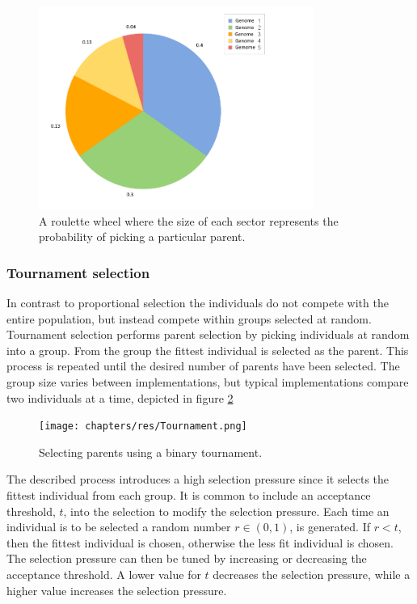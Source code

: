 \begin{figure}[H]
	\centering
	\includegraphics[width=0.80\textwidth, clip]{chapters/res/roulette.png}
	\caption{A roulette wheel where the size of each sector represents the probability of picking a particular parent.}
	\label{fig:roulette}
\end{figure}
		
\subsubsection{Tournament selection}
In contrast to proportional selection the individuals do not compete with the entire population, but instead compete within groups selected at random.
Tournament selection performs parent selection by picking individuals at random into a group.
From the group the fittest individual is selected as the parent.
This process is repeated until the desired number of parents have been selected.
The group size varies between implementations, but typical implementations compare two\cite{goh_sexual_2003} individuals at a time, depicted in figure \ref{fig:tournament}
		
\begin{figure}[H]	
	\centering
	\texttt{[image: chapters/res/Tournament.png]}
	\caption{Selecting parents using a binary tournament.}
	\label{fig:tournament}
\end{figure}

The described process introduces a high selection pressure since it selects the fittest individual from each group.
It is common to include an acceptance threshold, $t$, into the selection to modify the selection pressure\cite{goh_sexual_2003}.
Each time an individual is to be selected a random number $r \in (0, 1)$, is generated.
If $r < t$, then the fittest individual is chosen, otherwise the less fit individual is chosen. The selection pressure can then be tuned by increasing or decreasing the acceptance threshold. A lower value for $t$ decreases the selection pressure, while a higher value increases the selection pressure.


